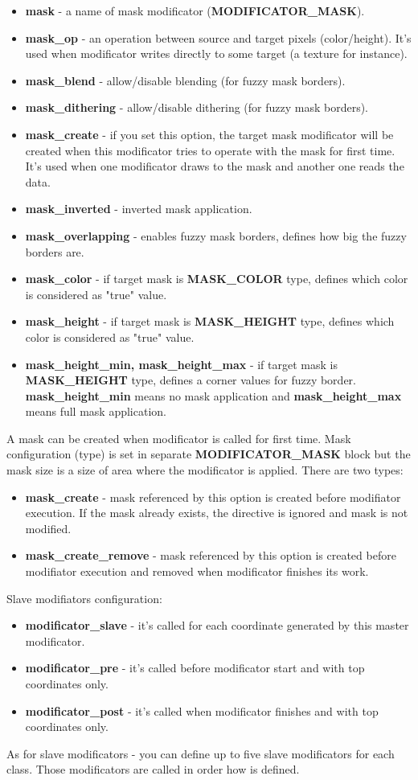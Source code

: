 \documentclass[9pt]{article}
\begin{document}
\begin{itemize}
\item{\bf mask} - a name of mask modificator ({\bf MODIFICATOR\_MASK}).
\item{\bf mask\_op} - an operation between source and target pixels (color/height). 
It's used when modificator writes directly to some target (a texture for instance).
\item{\bf mask\_blend} - allow/disable blending (for fuzzy mask borders).
\item{\bf mask\_dithering} - allow/disable dithering (for fuzzy mask borders).
\item{\bf mask\_create} - if you set this option, the target mask modificator will be created
when this modificator tries to operate with the mask for first time. It's used when one 
modificator draws to the mask and another one reads the data.
\item{\bf mask\_inverted} - inverted mask application.
\item{\bf mask\_overlapping} - enables fuzzy mask borders, defines how big the fuzzy
borders are.
\item{\bf mask\_color} - if target mask is {\bf MASK\_COLOR} type, defines which color
is considered as "true" value.
\item{\bf mask\_height} - if target mask is {\bf MASK\_HEIGHT} type, defines which color
is considered as "true" value.
\item{\bf mask\_height\_min, mask\_height\_max} - if target mask is {\bf MASK\_HEIGHT} type,
defines a corner values for fuzzy border. {\bf mask\_height\_min} means no mask application
and {\bf mask\_height\_max} means full mask application.
\end{itemize}
A mask can be created when modificator is called for first time. Mask configuration (type)
is set in separate {\bf MODIFICATOR\_MASK} block but the mask size is a size of area where 
the modificator is applied. There are two types:
\begin{itemize}
\item{\bf mask\_create} - mask referenced by this option is created before 
modifiator execution. If the mask already exists, the directive is ignored and
mask is not modified.
\item{\bf mask\_create\_remove} - mask referenced by this option is created before 
modifiator execution and removed when modificator finishes its work.
\end{itemize}
Slave modifiators configuration:
\begin{itemize}
\item{\bf modificator\_slave} - it's called for each coordinate generated 
by this master modificator.
\item{\bf modificator\_pre} - it's called before modificator start 
and with top coordinates only.
\item{\bf modificator\_post} - it's called when modificator finishes 
and with top coordinates only.
\end{itemize}
As for slave modificators - you can define up to five slave modificators for each class.
Those modificators are called in order how is defined.
\end{document}
